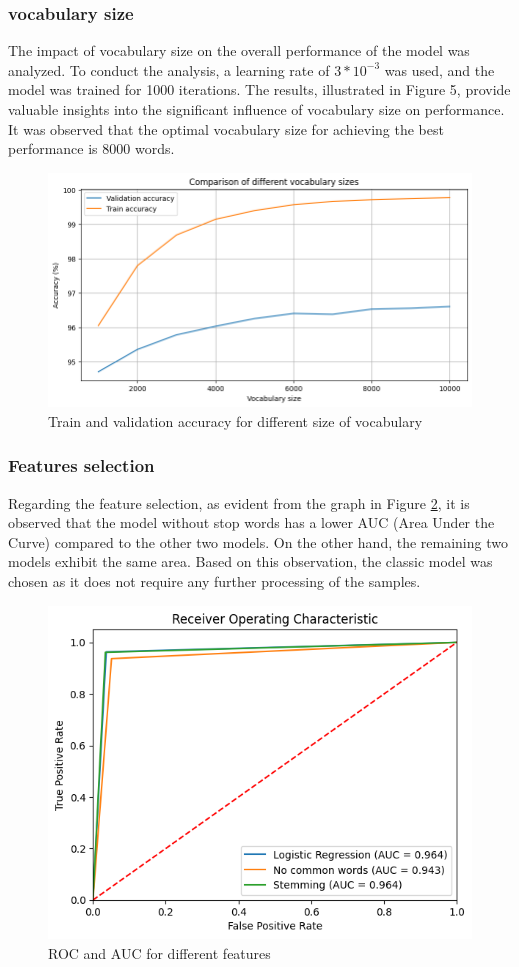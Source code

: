 \documentclass{class}
\begin{document}
\subsubsection*{vocabulary size}


The impact of vocabulary size on the overall performance of the model was analyzed.
To conduct the analysis, a learning rate of $3 * 10^{-3}$ was used, and the model was trained for 1000 iterations.
The results, illustrated in Figure 5, provide valuable insights into the significant influence of vocabulary size on performance.
It was observed that the optimal vocabulary size for achieving the best performance is 8000 words.

\begin{figure}[h]
    \centering
    \includegraphics[width=0.7\columnwidth]{images/lr_voc_size.png}
    \caption{Train and  validation accuracy for different size of vocabulary}
    \label{fig-5}
\end{figure}


\subsubsection*{Features selection}
Regarding the feature selection, as evident from the graph in Figure \ref{fig-6}, it is observed that the model without
stop words has a lower AUC (Area Under the Curve) compared to the other two models.
On the other hand, the remaining two models exhibit the same area.
Based on this observation, the classic model was chosen as it does not require any further processing of the samples.
\begin{figure}[h]
    \centering
    \includegraphics[width=0.7\columnwidth]{images/logreg_ROC_features_sel.png}
    \caption{ROC and AUC for different features}
    \label{fig-6}
\end{figure}
\end{document}
